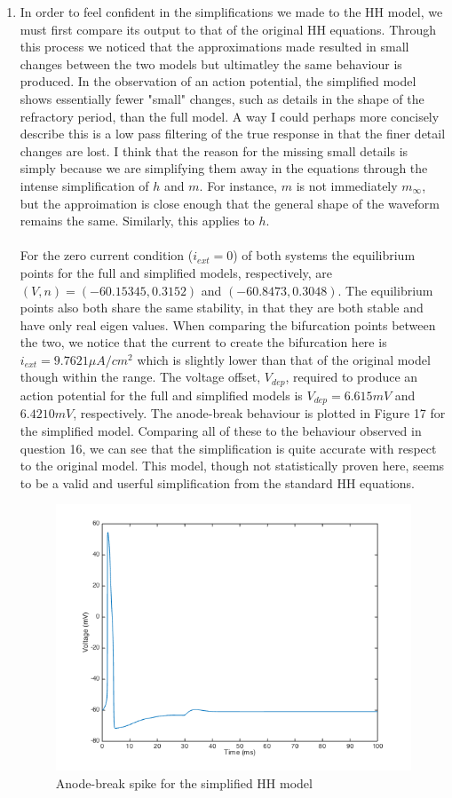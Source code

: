 \documentclass[10pt]{report}
\begin{document}
\begin{enumerate}
\item In order to feel confident in the simplifications we made to the HH model, we must first compare its output to that of the original HH equations. Through this process we noticed that the approximations made resulted in small changes between the two models but ultimatley the same behaviour is produced. In the observation of an action potential, the simplified model shows essentially fewer "small" changes, such as details in the shape of the refractory period, than the full model. A way I could perhaps more concisely describe this is a low pass filtering of the true response in that the finer detail changes are lost. I think that the reason for the missing small details is simply because we are simplifying them away in the equations through the intense simplification of $h$ and $m$. For instance, $m$ is not immediately $m_{\infty}$, but the approimation is close enough that the general shape of the waveform remains the same. Similarly, this applies to $h$. \\ \\ For the zero current condition ($i_{ext} = 0$) of both systems the equilibrium points for the full and simplified models, respectively, are $(V, n) = (-60.15345, 0.3152)$ and $(-60.8473, 0.3048)$. The equilibrium points also both share the same stability, in that they are both stable and have only real eigen values. When comparing the bifurcation points between the two, we notice that the current to create the bifurcation here is $i_{ext} = 9.7621 \mu A/cm^2$ which is slightly lower than that of the original model though within the range. The voltage offset, $V_{dep}$, required to produce an action potential for the full and simplified models is $V_{dep} = 6.615 mV$ and $6.4210 mV$, respectively. The anode-break behaviour is plotted in Figure 17 for the simplified model. Comparing all of these to the behaviour observed in question 16, we can see that the simplification is quite accurate with respect to the original model. This model, though not statistically proven here, seems to be a valid and userful simplification from the standard HH equations. \begin{figure}[h!] \includegraphics[scale=0.45]{motnq19.png} \caption[h17]{Anode-break spike for the simplified HH model} \end{figure}

\end{enumerate}
\end{document}

